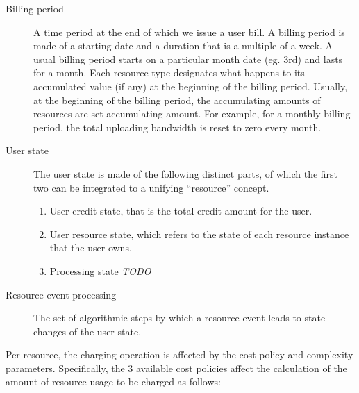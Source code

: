 \documentclass[preprint,10pt]{sigplanconf}
\newcommand{\TODO}{{\sl TODO \marginpar{\sl TODO}}}
\begin{document}
\begin{description}
\item[Billing period]
A time period at the end of which we issue a user bill.
A billing period is made of a starting date and a duration that is a multiple of a week.
A usual billing period starts on a particular month date (eg. 3rd) and lasts for a month.
Each resource type designates what happens to its accumulated value (if any) at the beginning of the billing period. Usually, at the beginning of the billing period, the accumulating amounts of resources are set accumulating amount. For example, for a monthly billing period, the total uploading bandwidth is reset to zero every month.
   
\item[User state]
The user state is made of the following distinct parts, of which the first two can be integrated to a unifying ``resource'' concept.

\begin{enumerate}
\item User credit state, that is the total credit amount for the user.

\item User resource state, which refers to the state of each resource instance that the user owns.

\item Processing state \TODO
\end{enumerate}

\item[Resource event processing]
The set of algorithmic steps by which a resource event leads to state changes of the user state.
\item[]

\item[]

\item[]

\item[]

\item[]


\end{description}

Per resource, the charging operation is affected by the cost policy and complexity
parameters. Specifically, the 3 available cost policies affect the calculation 
of the amount of resource usage to be charged as follows:
\end{document}
